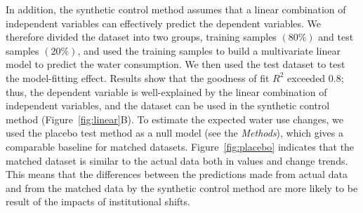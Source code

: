 \documentclass{article}
\begin{document}
In addition, the synthetic control method assumes that a linear combination of independent variables can effectively predict the dependent variables.
We therefore divided the dataset into two groups, training samples $(80\%)$ and test samples $(20\%)$, and used the training samples to build a multivariate linear model to predict the water consumption. We then used the test dataset to test the model-fitting effect.
Results show that the goodness of fit $R^2$ exceeded $0.8$; thus, the dependent variable is well-explained by the linear combination of independent variables, and the dataset can be used in the synthetic control method (Figure~\ref{fig:linear}B).
To estimate the expected water use changes, we used the placebo test method as a null model (see the \textit{Methods}), which gives a comparable baseline for matched datasets.
Figure~\ref{fig:placebo} indicates that the matched dataset is similar to the actual data both in values and change trends. This means that the differences between the predictions made from actual data and from the matched data by the synthetic control method are more likely to be result of the impacts of institutional shifts.
\end{document}
